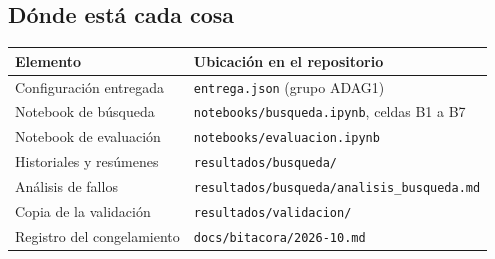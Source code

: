 \subsection{Dónde está cada cosa}

\begin{center}
\begin{tabular}{ll}
\toprule
Elemento & Ubicación en el repositorio \\
\midrule
Configuración entregada & \texttt{entrega.json} (grupo ADAG1) \\
Notebook de búsqueda & \texttt{notebooks/busqueda.ipynb}, celdas B1 a B7 \\
Notebook de evaluación & \texttt{notebooks/evaluacion.ipynb} \\
Historiales y resúmenes & \texttt{resultados/busqueda/} \\
Análisis de fallos & \texttt{resultados/busqueda/analisis\_busqueda.md} \\
Copia de la validación & \texttt{resultados/validacion/} \\
Registro del congelamiento & \texttt{docs/bitacora/2026-10.md} \\
\bottomrule
\end{tabular}
\end{center}

